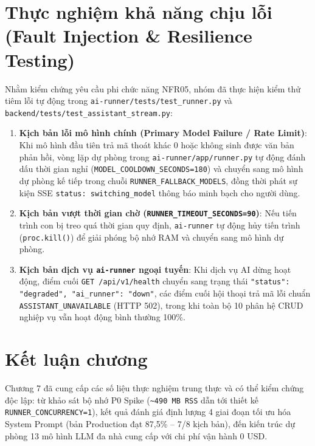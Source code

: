 \section{Thực nghiệm khả năng chịu lỗi (Fault Injection \& Resilience Testing)}

Nhằm kiểm chứng yêu cầu phi chức năng NFR05, nhóm đã thực hiện kiểm thử tiêm lỗi tự động trong \texttt{ai-runner/tests/test\_runner.py} và \texttt{backend/tests/test\_assistant\_stream.py}:
\begin{enumerate}[noitemsep,topsep=2pt]
 \item \textbf{Kịch bản lỗi mô hình chính (Primary Model Failure / Rate Limit)}: Khi mô hình đầu tiên trả mã thoát khác 0 hoặc không sinh được văn bản phản hồi, vòng lặp dự phòng trong \texttt{ai-runner/app/runner.py} tự động đánh dấu thời gian nghỉ (\texttt{MODEL\_COOLDOWN\_SECONDS=180}) và chuyển sang mô hình dự phòng kế tiếp trong chuỗi \texttt{RUNNER\_FALLBACK\_MODELS}, đồng thời phát sự kiện SSE \texttt{status: switching\_model} thông báo minh bạch cho người dùng.
 \item \textbf{Kịch bản vượt thời gian chờ (\texttt{RUNNER\_TIMEOUT\_SECONDS=90})}: Nếu tiến trình con bị treo quá thời gian quy định, \texttt{ai-runner} tự động hủy tiến trình (\texttt{proc.kill()}) để giải phóng bộ nhớ RAM và chuyển sang mô hình dự phòng.
 \item \textbf{Kịch bản dịch vụ \texttt{ai-runner} ngoại tuyến}: Khi dịch vụ AI dừng hoạt động, điểm cuối \texttt{GET /api/v1/health} chuyển sang trạng thái \texttt{"status": "degraded", "ai\_runner": "down"}, các điểm cuối hội thoại trả mã lỗi chuẩn \texttt{ASSISTANT\_UNAVAILABLE} (HTTP 502), trong khi toàn bộ 10 phân hệ CRUD nghiệp vụ vẫn hoạt động bình thường 100\%.
\end{enumerate}

\section{Kết luận chương}

Chương 7 đã cung cấp các số liệu thực nghiệm trung thực và có thể kiểm chứng độc lập: từ khảo sát bộ nhớ P0 Spike (\texttt{\~{}490 MB RSS} dẫn tới thiết kế \texttt{RUNNER\_CONCURRENCY=1}), kết quả đánh giá định lượng 4 giai đoạn tối ưu hóa System Prompt (bản Production đạt 87,5\% -- 7/8 kịch bản), đến kiến trúc dự phòng 13 mô hình LLM đa nhà cung cấp với chi phí vận hành 0 USD.
